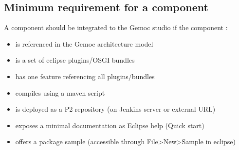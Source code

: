\documentclass{gemoc} %
\begin{document}
\subsection{Minimum requirement for a component}
A component should be integrated to the Gemoc studio if the component : 
\newline
\begin{itemize}
	\item is referenced in the Gemoc architecture model
	\item is a set of eclipse plugins/OSGI bundles
	\item has one feature referencing all plugins/bundles
	\item compiles using a maven script
	\item is deployed as a P2 repository (on Jenkins server or external URL)
	\item exposes a minimal documentation as Eclipse help (Quick start)
	\item offers a package sample (accessible through File>New>Sample in eclipse)
\end{itemize}
\end{document}
